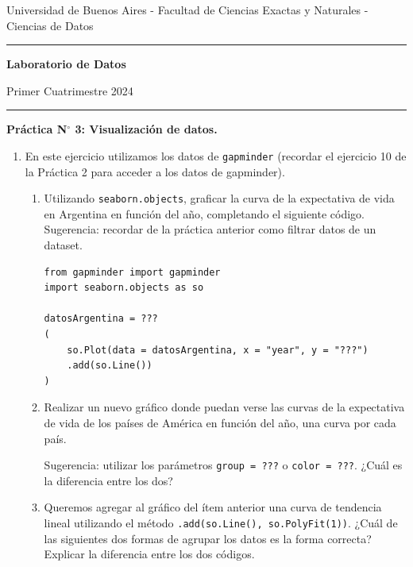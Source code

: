 \documentclass[a4paper,11pt]{article}
\theoremstyle{definition}
\begin{document}
\centerline{{\small Universidad de Buenos Aires - Facultad de Ciencias Exactas y Naturales - Ciencias de Datos}}

\vskip 0.2cm

\hrule

\vskip 0.2cm

 \centerline{{\bf\Large{\sc Laboratorio de Datos}}}

 \vskip 0.2cm

 \centerline{\ttfamily Primer Cuatrimestre 2024}

\vskip 0.2cm

 \hrule

 \bigskip
 \centerline{\bf Práctica N$^\circ$ 3: Visualizaci\'on de datos.}
 \bigskip



\begin{enumerate}[resume]

\item

En este ejercicio utilizamos los datos de \lstinline{gapminder} (recordar el ejercicio 10 de la Práctica 2 para acceder a los datos de gapminder).

\begin{enumerate}
\item Utilizando \lstinline{seaborn.objects}, graficar la curva de la expectativa de vida en Argentina en función del año, completando el siguiente código. Sugerencia: recordar de la práctica anterior como filtrar datos de un dataset.

\begin{lstlisting}
from gapminder import gapminder
import seaborn.objects as so

datosArgentina = ???
(
    so.Plot(data = datosArgentina, x = "year", y = "???")
    .add(so.Line())
)
\end{lstlisting}
    
    
\item Realizar un nuevo gráfico donde puedan verse las curvas de la expectativa de vida de los países de América en función del año, una curva por cada país.

    Sugerencia: utilizar los parámetros \lstinline{group = ???} o \lstinline{color = ???}. ¿Cuál es la diferencia entre los dos?
\item \label{ej:map} Queremos agregar al gráfico del ítem anterior una curva de tendencia lineal utilizando el método  \lstinline{.add(so.Line(), so.PolyFit(1))}. ¿Cuál de las siguientes dos formas de agrupar los datos es la forma correcta? Explicar la diferencia entre los dos códigos.


\end{enumerate}
\end{enumerate}
\end{document}
